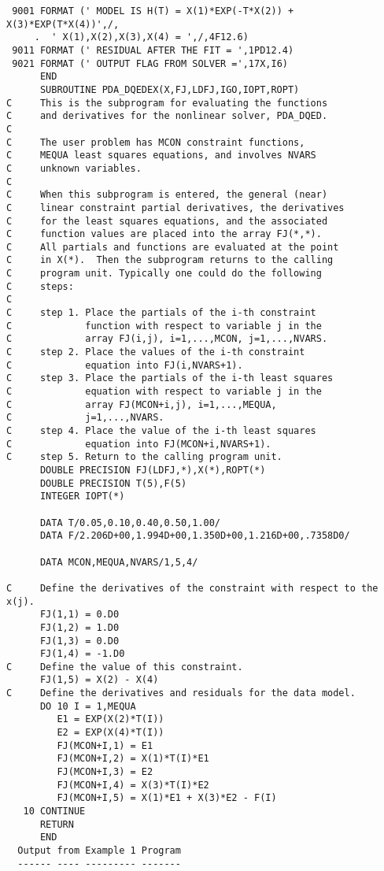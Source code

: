 \begin{verbatim}
 9001 FORMAT (' MODEL IS H(T) = X(1)*EXP(-T*X(2)) + X(3)*EXP(T*X(4))',/,
     .  ' X(1),X(2),X(3),X(4) = ',/,4F12.6)
 9011 FORMAT (' RESIDUAL AFTER THE FIT = ',1PD12.4)
 9021 FORMAT (' OUTPUT FLAG FROM SOLVER =',17X,I6)
      END
      SUBROUTINE PDA_DQEDEX(X,FJ,LDFJ,IGO,IOPT,ROPT)
C     This is the subprogram for evaluating the functions
C     and derivatives for the nonlinear solver, PDA_DQED.
C
C     The user problem has MCON constraint functions,
C     MEQUA least squares equations, and involves NVARS
C     unknown variables.
C
C     When this subprogram is entered, the general (near)
C     linear constraint partial derivatives, the derivatives
C     for the least squares equations, and the associated
C     function values are placed into the array FJ(*,*).
C     All partials and functions are evaluated at the point
C     in X(*).  Then the subprogram returns to the calling
C     program unit. Typically one could do the following
C     steps:
C
C     step 1. Place the partials of the i-th constraint
C             function with respect to variable j in the
C             array FJ(i,j), i=1,...,MCON, j=1,...,NVARS.
C     step 2. Place the values of the i-th constraint
C             equation into FJ(i,NVARS+1).
C     step 3. Place the partials of the i-th least squares
C             equation with respect to variable j in the
C             array FJ(MCON+i,j), i=1,...,MEQUA,
C             j=1,...,NVARS.
C     step 4. Place the value of the i-th least squares
C             equation into FJ(MCON+i,NVARS+1).
C     step 5. Return to the calling program unit.
      DOUBLE PRECISION FJ(LDFJ,*),X(*),ROPT(*)
      DOUBLE PRECISION T(5),F(5)
      INTEGER IOPT(*)

      DATA T/0.05,0.10,0.40,0.50,1.00/
      DATA F/2.206D+00,1.994D+00,1.350D+00,1.216D+00,.7358D0/

      DATA MCON,MEQUA,NVARS/1,5,4/

C     Define the derivatives of the constraint with respect to the x(j).
      FJ(1,1) = 0.D0
      FJ(1,2) = 1.D0
      FJ(1,3) = 0.D0
      FJ(1,4) = -1.D0
C     Define the value of this constraint.
      FJ(1,5) = X(2) - X(4)
C     Define the derivatives and residuals for the data model.
      DO 10 I = 1,MEQUA
         E1 = EXP(X(2)*T(I))
         E2 = EXP(X(4)*T(I))
         FJ(MCON+I,1) = E1
         FJ(MCON+I,2) = X(1)*T(I)*E1
         FJ(MCON+I,3) = E2
         FJ(MCON+I,4) = X(3)*T(I)*E2
         FJ(MCON+I,5) = X(1)*E1 + X(3)*E2 - F(I)
   10 CONTINUE
      RETURN
      END
  Output from Example 1 Program
  ------ ---- --------- -------


\end{verbatim}
